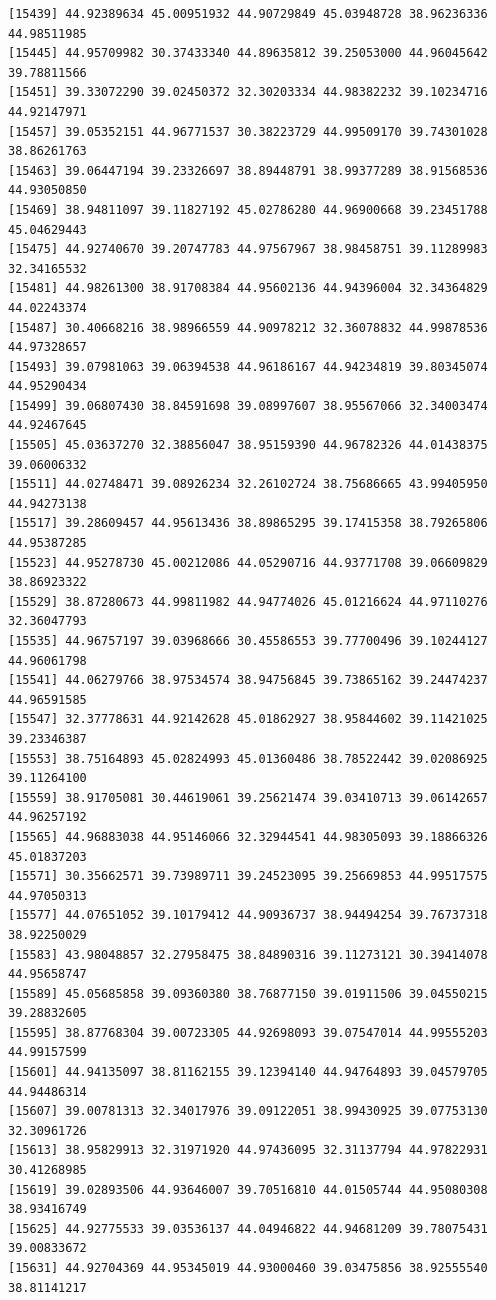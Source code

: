 \documentclass[
  letterpaper,
  DIV=11,
  numbers=noendperiod]{scrartcl}
\begin{document}
\begin{verbatim}
[15439] 44.92389634 45.00951932 44.90729849 45.03948728 38.96236336 44.98511985
[15445] 44.95709982 30.37433340 44.89635812 39.25053000 44.96045642 39.78811566
[15451] 39.33072290 39.02450372 32.30203334 44.98382232 39.10234716 44.92147971
[15457] 39.05352151 44.96771537 30.38223729 44.99509170 39.74301028 38.86261763
[15463] 39.06447194 39.23326697 38.89448791 38.99377289 38.91568536 44.93050850
[15469] 38.94811097 39.11827192 45.02786280 44.96900668 39.23451788 45.04629443
[15475] 44.92740670 39.20747783 44.97567967 38.98458751 39.11289983 32.34165532
[15481] 44.98261300 38.91708384 44.95602136 44.94396004 32.34364829 44.02243374
[15487] 30.40668216 38.98966559 44.90978212 32.36078832 44.99878536 44.97328657
[15493] 39.07981063 39.06394538 44.96186167 44.94234819 39.80345074 44.95290434
[15499] 39.06807430 38.84591698 39.08997607 38.95567066 32.34003474 44.92467645
[15505] 45.03637270 32.38856047 38.95159390 44.96782326 44.01438375 39.06006332
[15511] 44.02748471 39.08926234 32.26102724 38.75686665 43.99405950 44.94273138
[15517] 39.28609457 44.95613436 38.89865295 39.17415358 38.79265806 44.95387285
[15523] 44.95278730 45.00212086 44.05290716 44.93771708 39.06609829 38.86923322
[15529] 38.87280673 44.99811982 44.94774026 45.01216624 44.97110276 32.36047793
[15535] 44.96757197 39.03968666 30.45586553 39.77700496 39.10244127 44.96061798
[15541] 44.06279766 38.97534574 38.94756845 39.73865162 39.24474237 44.96591585
[15547] 32.37778631 44.92142628 45.01862927 38.95844602 39.11421025 39.23346387
[15553] 38.75164893 45.02824993 45.01360486 38.78522442 39.02086925 39.11264100
[15559] 38.91705081 30.44619061 39.25621474 39.03410713 39.06142657 44.96257192
[15565] 44.96883038 44.95146066 32.32944541 44.98305093 39.18866326 45.01837203
[15571] 30.35662571 39.73989711 39.24523095 39.25669853 44.99517575 44.97050313
[15577] 44.07651052 39.10179412 44.90936737 38.94494254 39.76737318 38.92250029
[15583] 43.98048857 32.27958475 38.84890316 39.11273121 30.39414078 44.95658747
[15589] 45.05685858 39.09360380 38.76877150 39.01911506 39.04550215 39.28832605
[15595] 38.87768304 39.00723305 44.92698093 39.07547014 44.99555203 44.99157599
[15601] 44.94135097 38.81162155 39.12394140 44.94764893 39.04579705 44.94486314
[15607] 39.00781313 32.34017976 39.09122051 38.99430925 39.07753130 32.30961726
[15613] 38.95829913 32.31971920 44.97436095 32.31137794 44.97822931 30.41268985
[15619] 39.02893506 44.93646007 39.70516810 44.01505744 44.95080308 38.93416749
[15625] 44.92775533 39.03536137 44.04946822 44.94681209 39.78075431 39.00833672
[15631] 44.92704369 44.95345019 44.93000460 39.03475856 38.92555540 38.81141217

\end{verbatim}
\end{document}
